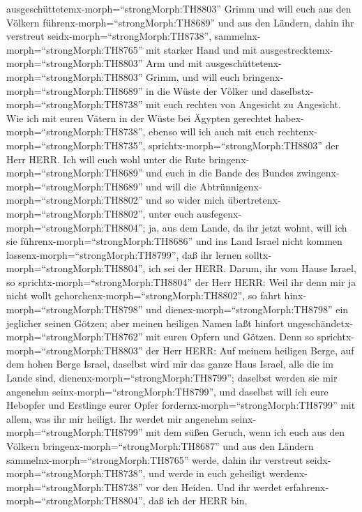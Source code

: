 ausgeschüttetemx-morph=``strongMorph:TH8803'' Grimm  und
will euch aus den Völkern führenx-morph=``strongMorph:TH8689'' und aus
den Ländern, dahin ihr verstreut seidx-morph=``strongMorph:TH8738'',
sammelnx-morph=``strongMorph:TH8765'' mit starker Hand und mit
ausgestrecktemx-morph=``strongMorph:TH8803'' Arm und mit
ausgeschüttetenx-morph=``strongMorph:TH8803'' Grimm,  und
will euch bringenx-morph=``strongMorph:TH8689'' in die Wüste der Völker
und daselbstx-morph=``strongMorph:TH8738'' mit euch rechten von
Angesicht zu Angesicht.  Wie ich mit euren Vätern in der
Wüste bei Ägypten gerechtet habex-morph=``strongMorph:TH8738'', ebenso
will ich auch mit euch rechtenx-morph=``strongMorph:TH8735'',
sprichtx-morph=``strongMorph:TH8803'' der Herr HERR.  Ich
will euch wohl unter die Rute bringenx-morph=``strongMorph:TH8689'' und
euch in die Bande des Bundes zwingenx-morph=``strongMorph:TH8689''
 und will die Abtrünnigenx-morph=``strongMorph:TH8802'' und
so wider mich übertretenx-morph=``strongMorph:TH8802'', unter euch
ausfegenx-morph=``strongMorph:TH8804''; ja, aus dem Lande, da ihr jetzt
wohnt, will ich sie führenx-morph=``strongMorph:TH8686'' und ins Land
Israel nicht kommen lassenx-morph=``strongMorph:TH8799'', daß ihr lernen
solltx-morph=``strongMorph:TH8804'', ich sei der HERR. 
Darum, ihr vom Hause Israel, so sprichtx-morph=``strongMorph:TH8804''
der Herr HERR: Weil ihr denn mir ja nicht wollt
gehorchenx-morph=``strongMorph:TH8802'', so fahrt
hinx-morph=``strongMorph:TH8798'' und
dienex-morph=``strongMorph:TH8798'' ein jeglicher seinen Götzen; aber
meinen heiligen Namen laßt hinfort
ungeschändetx-morph=``strongMorph:TH8762'' mit euren Opfern und Götzen.
 Denn so sprichtx-morph=``strongMorph:TH8803'' der Herr
HERR: Auf meinem heiligen Berge, auf dem hohen Berge Israel, daselbst
wird mir das ganze Haus Israel, alle die im Lande sind,
dienenx-morph=``strongMorph:TH8799''; daselbst werden sie mir angenehm
seinx-morph=``strongMorph:TH8799'', und daselbst will ich eure Hebopfer
und Erstlinge eurer Opfer fordernx-morph=``strongMorph:TH8799'' mit
allem, was ihr mir heiligt.  Ihr werdet mir angenehm
seinx-morph=``strongMorph:TH8799'' mit dem süßen Geruch, wenn ich euch
aus den Völkern bringenx-morph=``strongMorph:TH8687'' und aus den
Ländern sammelnx-morph=``strongMorph:TH8765'' werde, dahin ihr verstreut
seidx-morph=``strongMorph:TH8738'', und werde in euch geheiligt
werdenx-morph=``strongMorph:TH8738'' vor den Heiden.  Und
ihr werdet erfahrenx-morph=``strongMorph:TH8804'', daß ich der HERR bin,
